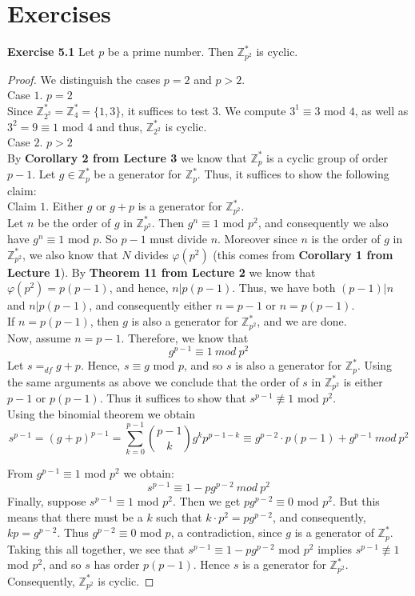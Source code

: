 \documentclass[a4paper]{article}
\begin{document}
\section{Exercises}
\noindent \textbf{Exercise 5.1}  Let $p$ be a prime number. Then $\mathbb{Z}^{*}_{p^2}$ is cyclic.
\begin{proof}
We distinguish the cases $p = 2$ and $p > 2$.\\
Case $1$. $p = 2$\\
Since $\mathbb{Z}_{2^{2}}^{*} = \mathbb{Z}_{4}^{*} = \{1, 3 \}$, it suffices to test $3$. We compute $3^{1} \equiv 3$ mod $4$, as well as $3^2 = 9 \equiv 1$ mod $4$ and thus, $\mathbb{Z}_{2^{2}}^{*}$ is cyclic.\\
Case $2$. $p > 2$\\
By \textbf{Corollary 2 from Lecture 3} we know that $\mathbb{Z}_{p}^{*}$ is a cyclic group of order $p - 1$. Let $g \in \mathbb{Z}_{p}^{*}$ be a generator for $\mathbb{Z}_{p}^{*}$. Thus, it suffices to show the following claim:\\
Claim $1$. Either $g$ or $g + p$ is a generator for $\mathbb{Z}_{p^{2}}^{*}$.\\
Let $n$ be the order of $g$ in $\mathbb{Z}_{p^{2}}^{*}$. Then $g^{n} \equiv 1$ mod $p^{2}$, and consequently we also have $g^{n} \equiv 1$ mod $p$. So $p - 1$ must divide $n$. Moreover since $n$ is the order of $g$ in $\mathbb{Z}_{p^{2}}^{*}$, we also know that $N$ divides $\varphi (p^{2})$ (this comes from \textbf{Corollary 1 from Lecture 1}). By \textbf{Theorem 11 from Lecture 2} we know that $\varphi (p^{2}) = p(p - 1)$, and hence, $n|p(p - 1)$. Thus, we have both $(p - 1)|n$ and $n|p(p - 1)$, and consequently either $n = p - 1$ or $n = p(p - 1)$.\\
If $n = p(p - 1)$, then $g$ is also a generator for $\mathbb{Z}_{p^{2}}^{*}$, and we are done.\\
Now, assume $n = p - 1$. Therefore, we know that
$$g^{p - 1} \equiv 1\ mod\ p^{2}$$
Let $s =_{df} g + p$. Hence, $s \equiv g$ mod $p$, and so $s$ is also a generator for $\mathbb{Z}_{p}^{*}$. Using the same arguments as above we conclude that the order of $s$ in $\mathbb{Z}_{p^{2}}^{*}$ is either $p - 1$ or $p(p - 1)$. Thus it suffices to show that $s^{p - 1} \not \equiv 1$ mod $p^{2}$.\\
Using the binomial theorem we obtain
$$s^{p-1} = (g + p)^{p - 1} = \sum_{k = 0}^{p - 1} \binom{p-1}{k} g^{k}p^{p - 1 - k} \equiv g^{p - 2} \cdot p(p - 1) + g^{p - 1}\ mod\ p^{2}$$

From $g^{p - 1} \equiv 1$ mod $p^{2}$ we obtain:
$$s^{p - 1} \equiv 1 - pg^{p-2}\ mod\ p^{2}$$
Finally, suppose $s^{p - 1} \equiv 1$ mod $p^{2}$. Then we get $pg^{p - 2} \equiv 0$ mod $p^{2}$. But this means that there must be a $k$ such that $k \cdot p^{2} = pg^{p - 2}$, and consequently, $kp = g^{p - 2}$. Thus $g^{p - 2} \equiv 0$ mod $p$, a contradiction, since $g$ is a generator of $\mathbb{Z}_{p}^{*}$.\\
Taking this all together, we see that $s^{p - 1} \equiv 1 - pg^{p-2}$ mod $p^{2}$ implies $s^{p - 1} \not \equiv 1$ mod $p^{2}$, and so $s$ has order $p(p - 1)$. Hence $s$ is a generator for $\mathbb{Z}_{p^{2}}^{*}$. Consequently, $\mathbb{Z}_{p^{2}}^{*}$ is cyclic.
\end{proof}
\end{document}
